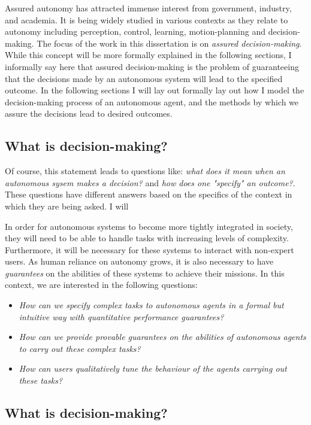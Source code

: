 Assured autonomy has attracted immense interest from government, industry, and academia. It is being widely studied in various contexts as they relate to autonomy including perception, control, learning, motion-planning and decision-making. The focus of the work in this dissertation is on \emph{assured decision-making}. While this concept will be more formally explained in the following sections, I informally say here that assured decision-making is the problem of guaranteeing that the decisions made by an autonomous system will lead to the specified outcome. In the following sections I will lay out formally lay out how I model the decision-making process of an autonomous agent, and the methods by which we assure the decisions lead to desired outcomes. 


\subsection{What is decision-making?}





Of course, this statement leads to questions like: \emph{what does it mean when an autonomous sysem makes a decision?} and \emph{how does one "specify" an outcome?}. These questions have different answers based on the specifics of the context in which they are being asked. I will 




In order for autonomous systems to become more tightly integrated in society, they will need to be able to handle tasks with increasing levels of complexity. Furthermore, it will be necessary for these systems to interact with non-expert users. As human reliance on autonomy grows, it is also necessary to have \emph{guarantees} on the abilities of these systems to achieve their missions. In this context, we are interested in the following questions:
\begin{itemize}
	\item \emph{How can we specify complex tasks to autonomous agents in a formal but intuitive way with quantitative performance guarantees?}
	\item \emph{How can we provide provable guarantees on the abilities of autonomous agents to carry out these complex tasks?}
	\item \emph{How can users qualitatively tune the behaviour of the agents carrying out these tasks?}
\end{itemize}

\subsection{What is decision-making?}

